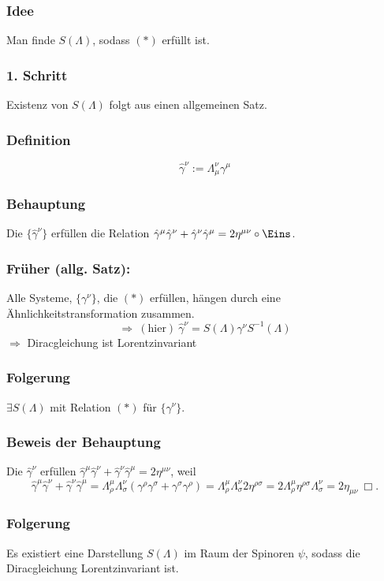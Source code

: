 \documentclass[twoside,a4paper]{scrartcl}
\renewcommand{\1}{\mathds{1}}
\newcommand{\Ra}{\Rightarrow}
\renewcommand{\L}{\Lambda}
\begin{document}
\subsubsection*{Idee}
Man finde $S(\L)$, sodass $(*)$ erfüllt ist.
\subsubsection*{1. Schritt}
Existenz von $S(\L)$ folgt aus einen allgemeinen Satz.
\subsubsection*{Definition}
$$\hat \gamma^\nu:= \L_\mu^\nu \gamma^\mu$$
\subsubsection*{Behauptung}
Die $\{\hat \gamma^\nu \}$ erfüllen die Relation $\hat\gamma^\mu\hat\gamma^\nu+\hat \gamma^\nu\hat \gamma^\mu=2 \eta^{\mu\nu}\circ \Eins$.
\subsubsection*{Früher (allg. Satz):}
Alle Systeme, $\{\gamma^\nu\}$, die $(*)$ erfüllen, hängen durch eine Ähnlichkeitstransformation zusammen.\\
$$\Ra \ \mathrm{(hier)} \ \hat \gamma^\nu=S(\L) \gamma^\nu S^{-1}(\L)$$
$\Ra$ Diracgleichung ist Lorentzinvariant
\subsubsection*{Folgerung}
$\exists S(\L)$ mit Relation $(*)$ für $\{\gamma^\nu\}$.
\subsubsection*{Beweis der Behauptung}
Die $\hat \gamma^\nu$ erfüllen $\hat \gamma^\mu \hat \gamma^\nu+\hat \gamma^\nu \hat \gamma^\mu=2 \eta^{\mu\nu} $, weil 
$$\hat \gamma^\mu \hat \gamma^\nu+\hat \gamma^\nu \hat \gamma^\mu=\L^\mu_\rho \L_\sigma^\nu(\gamma^\rho\gamma^\sigma+\gamma^\sigma\gamma^\rho)=\L_\rho^\mu \L^\nu_\sigma 2 \eta^{\rho\sigma}=2\L_\rho^\mu \eta^{\rho\sigma}\L^\nu_\sigma =2\eta_{\mu\nu} \ \Box.$$
\subsubsection*{Folgerung}
Es existiert eine Darstellung $S(\L)$ im Raum der Spinoren $\psi$, sodass die Diracgleichung Lorentzinvariant ist.
\end{document}
